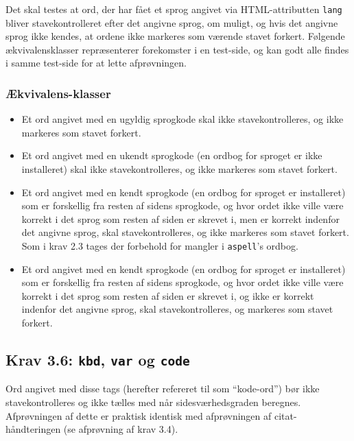 \documentclass[a4paper,oneside,article]{memoir}
\begin{document}
\begin{landscape}
Det skal testes at ord, der har fået et sprog angivet via
HTML-attributten \texttt{lang} bliver stavekontrolleret efter det
angivne sprog, om muligt, og hvis det angivne sprog ikke kendes, at
ordene ikke markeres som værende stavet forkert. Følgende
ækvivalensklasser repræsenterer forekomster i en test-side, og kan
godt alle findes i samme test-side for at lette afprøvningen.

\subsubsection{Ækvivalens-klasser}
\begin{itemize}
\item Et ord angivet med en ugyldig sprogkode skal ikke
  stavekontrolleres, og ikke markeres som stavet forkert.
\item Et ord angivet med en ukendt sprogkode (en ordbog for sproget er
  ikke installeret) skal ikke stavekontrolleres, og ikke markeres som
  stavet forkert.
\item Et ord angivet med en kendt sprogkode (en ordbog for sproget er
  installeret) som er forskellig fra resten af sidens sprogkode, og
  hvor ordet ikke ville være korrekt i det sprog som resten af siden
  er skrevet i, men er korrekt indenfor det angivne sprog, skal
  stavekontrolleres, og ikke markeres som stavet forkert. Som i krav
  2.3 tages der forbehold for mangler i \texttt{aspell}'s ordbog.
\item Et ord angivet med en kendt sprogkode (en ordbog for sproget er
  installeret) som er forskellig fra resten af sidens sprogkode, og
  hvor ordet ikke ville være korrekt i det sprog som resten af siden
  er skrevet i, og ikke er korrekt indenfor det angivne sprog, skal
  stavekontrolleres, og markeres som stavet forkert.
\end{itemize}

\subsection{Krav 3.6: \texttt{kbd}, \texttt{var} og \texttt{code}}

Ord angivet med disse tags (herefter refereret til som ``kode-ord'')
bør ikke stavekontrolleres og ikke tælles med når sidesværhedsgraden
beregnes. Afprøvningen af dette er praktisk identisk med afprøvningen
af citat-håndteringen (se afprøvning af krav 3.4).


\end{landscape}
\end{document}
